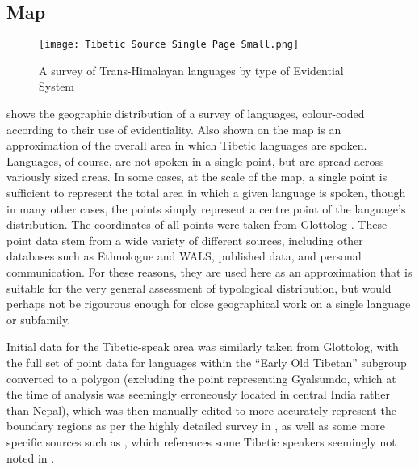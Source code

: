 \subsection{Map}\label{ss:History:Map}
\begin{figure}
    \caption{A survey of Trans-Himalayan languages by type of Evidential System}
    \centering
    \texttt{[image: Tibetic Source Single Page Small.png]}
    \label{map:EvidentialityMap}
\end{figure}
 shows the geographic distribution of a survey of languages, colour-coded according to their use of evidentiality. Also shown on the map is an approximation of the overall area in which Tibetic languages are spoken. Languages, of course, are not spoken in a single point, but are spread across variously sized areas. In some cases, at the scale of the map, a single point is sufficient to represent the total area in which a given language is spoken, though in many other cases, the points simply represent a centre point of the language's distribution. The coordinates of all points were taken from Glottolog \cite{glottolog}. These point data stem from a wide variety of different sources, including other databases such as Ethnologue and WALS, published data, and personal communication. For these reasons, they are used here as an approximation that is suitable for the very general assessment of typological distribution, but would perhaps not be rigourous enough for close geographical work on a single language or subfamily. 

Initial data for the Tibetic-speak area was similarly taken from Glottolog, with the full set of point data for languages within the ``Early Old Tibetan'' subgroup converted to a polygon (excluding the point representing Gyalsumdo, which at the time of analysis was seemingly erroneously located in central India rather than Nepal), which was then manually edited to more accurately represent the boundary regions as per the highly detailed survey in , as well as some more specific sources such as , which references some Tibetic speakers seemingly not noted in .

